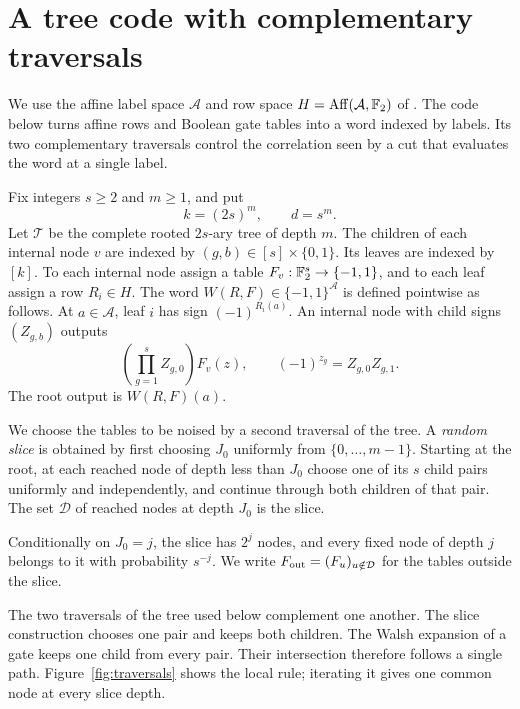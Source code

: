 \section{A tree code with complementary traversals}
\label{sec:tree}

We use the affine label space $\mathcal A$ and row space
$H=\operatorname{Aff}(\mathcal A,\mathbb F_2)$ of .
The code below turns affine rows and Boolean gate tables into a word
indexed by labels. Its two complementary traversals control the
correlation seen by a cut that evaluates the word at a single label.

\begin{definition}
\label{def:tree-code}
Fix integers $s\ge2$ and $m\ge1$, and put
\[
 k=(2s)^m,\qquad d=s^m.
\]
Let $\mathcal T$ be the complete rooted $2s$-ary tree of depth $m$.
The children of each internal node $v$ are indexed by
$(g,b)\in[s]\times\{0,1\}$.  Its leaves are indexed by $[k]$.
To each internal node assign a table
$F_v:\mathbb F_2^s\to\{-1,1\}$, and to each leaf assign a row $R_i\in H$.
The word $W(R,F)\in\{-1,1\}^{\mathcal A}$ is defined pointwise as
follows.  At $a\in\mathcal A$, leaf $i$ has sign $(-1)^{R_i(a)}$.
An internal node with child signs $(Z_{g,b})$ outputs
\begin{equation}
 \left(\prod_{g=1}^s Z_{g,0}\right)F_v(z),
 \qquad (-1)^{z_g}=Z_{g,0}Z_{g,1}.
 \label{eq:gate-rule}
\end{equation}
The root output is $W(R,F)(a)$.
\end{definition}

We choose the tables to be noised by a second traversal of the tree.
A \emph{random slice} is obtained by first choosing
$J_0$ uniformly from $\{0,\ldots,m-1\}$.  Starting at the root,
at each reached node of depth less than $J_0$ choose one of its $s$
child pairs uniformly and independently, and continue through both
children of that pair.  The set $\mathcal D$ of reached nodes at
depth $J_0$ is the slice.

Conditionally on $J_0=j$, the slice has $2^j$ nodes, and every fixed
node of depth $j$ belongs to it with probability $s^{-j}$.
We write $F_{\rm out}=(F_u)_{u\notin\mathcal D}$ for the tables
outside the slice.

The two traversals of the tree used below complement one another.
The slice construction chooses one pair and keeps both children.
The Walsh expansion of a gate keeps one child from every pair.
Their intersection therefore follows a single path. Figure~\ref{fig:traversals}
shows the local rule; iterating it gives one common node at every slice depth.

